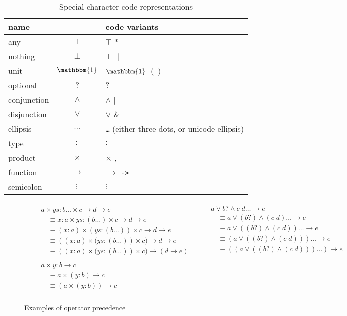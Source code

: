\documentclass[10pt]{article}
\begin{document}
\begin{table}[ht]
\begin{center}
\begin{tabular}{lcl}
name & & code variants \\
\hline
any          & $\top$   & $\top$ $\mathtt{*}$ \\
nothing      & $\bot$   & $\bot$ $\mathtt{\_|\_}$ \\
unit         & $\mathbbm{1}$ & $\mathbbm{1}$ $\mathtt{()}$ \\
optional     & $?$      & $\mathtt{?}$ \\
conjunction  & $\land$  & $\land$ $\mathtt{|}$ \\
disjunction  & $\lor$   & $\lor$ $\mathtt{\&}$ \\
ellipsis     & $\ldots$ & \texttt{\ldots} (either three dots, or unicode ellipsis) \\
type         & $:$      & $\mathtt{:}$ \\
product      & $\times$ & $\times$ $\mathtt{,}$ \\
function     & $\to$    & $\to$ \texttt{->} \\
semicolon    & $;$      & $\mathtt{;}$
\end{tabular}
\end{center}
\caption{Special character code representations}
\end{table}

\begin{figure}[ht]
\begin{align*}
&\begin{aligned}
&a \times ys : b \ldots \times c \to d \to e \\
&\quad\equiv x : a \times ys : (b \ldots) \times c \to d \to e \\
&\quad\equiv (x : a) \times (ys : (b \ldots)) \times c \to d \to e \\
&\quad\equiv ((x : a) \times \big(ys : (b \ldots)) \times c) \to d \to e \\
&\quad\equiv ((x : a) \times \big(ys : (b \ldots)) \times c) \to (d \to e)
\end{aligned}
&
&\begin{aligned}
&a \lor b? \land c\; d \ldots \to e \\
&\quad\equiv a \lor (b?) \land (c\; d) \ldots \to e \\
&\quad\equiv a \lor ((b?) \land (c\; d)) \ldots \to e \\
&\quad\equiv (a \lor ((b?) \land (c\; d))) \ldots \to e \\
&\quad\equiv ((a \lor ((b?) \land (c\; d))) \ldots) \to e \\
\end{aligned}
\\
&\begin{aligned}
&a \times y : b \to c \\
&\quad\equiv a \times (y : b) \to c \\
&\quad\equiv (a \times (y : b)) \to c \\
\end{aligned}
&
\end{align*}
\caption{Examples of operator precedence}
\end{figure}
\end{document}
